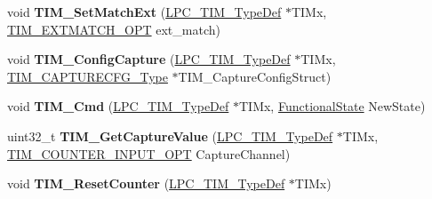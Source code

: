 \begin{DoxyCompactItemize}
\item 
\hypertarget{group___t_i_m___public___functions_gad9422f8943045585a809979478bf1177}{void {\bfseries \-T\-I\-M\-\_\-\-Set\-Match\-Ext} (\hyperlink{struct_l_p_c___t_i_m___type_def}{\-L\-P\-C\-\_\-\-T\-I\-M\-\_\-\-Type\-Def} $\ast$\-T\-I\-Mx, \hyperlink{group___t_i_m___public___types_ga08bf1adf0884db3eb03d0a63c8bac082}{\-T\-I\-M\-\_\-\-E\-X\-T\-M\-A\-T\-C\-H\-\_\-\-O\-P\-T} ext\-\_\-match)}\label{group___t_i_m___public___functions_gad9422f8943045585a809979478bf1177}

\item 
\hypertarget{group___t_i_m___public___functions_ga1dd4788d1e9088eb3ca2a01051253b0b}{void {\bfseries \-T\-I\-M\-\_\-\-Config\-Capture} (\hyperlink{struct_l_p_c___t_i_m___type_def}{\-L\-P\-C\-\_\-\-T\-I\-M\-\_\-\-Type\-Def} $\ast$\-T\-I\-Mx, \hyperlink{struct_t_i_m___c_a_p_t_u_r_e_c_f_g___type}{\-T\-I\-M\-\_\-\-C\-A\-P\-T\-U\-R\-E\-C\-F\-G\-\_\-\-Type} $\ast$\-T\-I\-M\-\_\-\-Capture\-Config\-Struct)}\label{group___t_i_m___public___functions_ga1dd4788d1e9088eb3ca2a01051253b0b}

\item 
\hypertarget{group___t_i_m___public___functions_ga7828cdcc050e237cbfbbd6422e40f697}{void {\bfseries \-T\-I\-M\-\_\-\-Cmd} (\hyperlink{struct_l_p_c___t_i_m___type_def}{\-L\-P\-C\-\_\-\-T\-I\-M\-\_\-\-Type\-Def} $\ast$\-T\-I\-Mx, \hyperlink{group___l_p_c___types___public___types_gac9a7e9a35d2513ec15c3b537aaa4fba1}{\-Functional\-State} \-New\-State)}\label{group___t_i_m___public___functions_ga7828cdcc050e237cbfbbd6422e40f697}

\item 
\hypertarget{group___t_i_m___public___functions_ga5a9897b2b5e8daeee437331bd7690096}{uint32\-\_\-t {\bfseries \-T\-I\-M\-\_\-\-Get\-Capture\-Value} (\hyperlink{struct_l_p_c___t_i_m___type_def}{\-L\-P\-C\-\_\-\-T\-I\-M\-\_\-\-Type\-Def} $\ast$\-T\-I\-Mx, \hyperlink{group___t_i_m___public___types_ga1233168d247f0633970dfaf040acf5a3}{\-T\-I\-M\-\_\-\-C\-O\-U\-N\-T\-E\-R\-\_\-\-I\-N\-P\-U\-T\-\_\-\-O\-P\-T} \-Capture\-Channel)}\label{group___t_i_m___public___functions_ga5a9897b2b5e8daeee437331bd7690096}

\item 
\hypertarget{group___t_i_m___public___functions_gaff7100a0314e014c5d46d564bcb2a443}{void {\bfseries \-T\-I\-M\-\_\-\-Reset\-Counter} (\hyperlink{struct_l_p_c___t_i_m___type_def}{\-L\-P\-C\-\_\-\-T\-I\-M\-\_\-\-Type\-Def} $\ast$\-T\-I\-Mx)}\label{group___t_i_m___public___functions_gaff7100a0314e014c5d46d564bcb2a443}

\end{DoxyCompactItemize}
